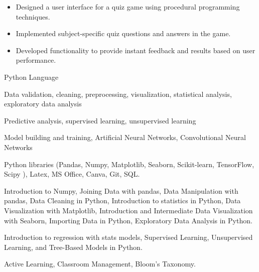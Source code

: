 \documentclass[10pt,a4paper,ragged2e,withhyper]{altacv}
\begin{document}
\begin{paracol}{2}
\divider
{}
\begin{itemize}
\item Designed a user interface for a quiz game using procedural programming techniques.
\item Implemented subject-specific quiz questions and answers in the game.
\item Developed functionality to provide instant feedback and results based on user performance.
\end{itemize}

\medskip

\switchcolumn


Python Language

\divider

Data validation, cleaning, preprocessing, visualization, statistical analysis, exploratory data analysis

\divider

Predictive analysis, supervised learning, unsupervised learning

\divider

Model building and training, Artificial Neural Networks, Convolutional Neural Networks

\divider

Python libraries (Pandas, Numpy, Matplotlib, Seaborn, Scikit-learn, TensorFlow, Scipy ), Latex, MS Office, Canva, Git, SQL.




Introduction to Numpy, Joining Data with pandas, Data Manipulation with pandas, Data Cleaning in Python, Introduction to statistics in Python, Data Visualization with Matplotlib, Introduction and Intermediate Data Visualization with Seaborn, Importing Data in Python, Exploratory Data Analysis in Python.

Introduction to regression with stats models, Supervised Learning, Unsupervised Learning, and Tree-Based Models in Python.

Active Learning, Classroom Management, Bloom's Taxonomy.


\end{paracol}
\end{document}
